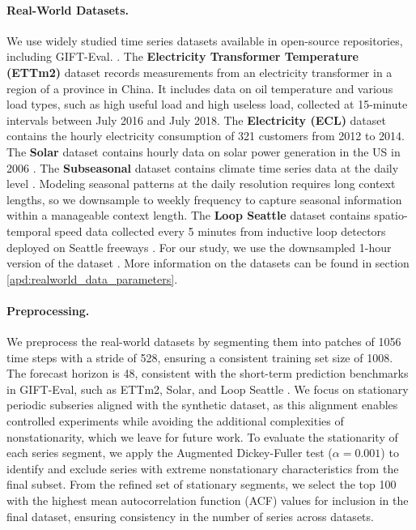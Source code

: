 \paragraph{Real-World Datasets.} We use widely studied time series datasets available in open-source repositories, including GIFT-Eval. \citep{aksu2024giftevalbenchmark}. The \textbf{Electricity Transformer Temperature (ETTm2)} dataset records measurements from an electricity transformer in a region of a province in China. It includes data on oil temperature and various load types, such as high useful load and high useless load, collected at 15-minute intervals between July 2016 and July 2018. The \textbf{Electricity (ECL)} dataset contains the hourly electricity consumption of 321 customers from 2012 to 2014. The \textbf{Solar} dataset contains hourly data on solar power generation in the US in 2006 \citep{aksu2024giftevalbenchmark, aws2024chronos}. The \textbf{Subseasonal} dataset contains climate time series data at the daily level \citep{mouatadid2024subseasonalsubseasonaldataset, aksu2024giftevalbenchmark}. Modeling seasonal patterns at the daily resolution requires long context lengths, so we downsample to weekly frequency to capture seasonal information within a manageable context length. The \textbf{Loop Seattle} dataset contains spatio-temporal speed data collected every 5 minutes from inductive loop detectors deployed on Seattle freeways \citep{cui2018deep, cui2019traffic}. For our study, we use the downsampled 1-hour version of the dataset \citep{jiang2024libcityunifiedlibraryefficient, aksu2024giftevalbenchmark}. More information on the datasets can be found in section \ref{apd:realworld_data_parameters}.

\paragraph{Preprocessing.}
We preprocess the real-world datasets by segmenting them into patches of 1056 time steps with a stride of 528, ensuring a consistent training set size of 1008. The forecast horizon is 48, consistent with the short-term prediction benchmarks in GIFT-Eval, such as ETTm2, Solar, and Loop Seattle \citep{aksu2024giftevalbenchmark}. We focus on stationary periodic subseries aligned with the synthetic dataset, as this alignment enables controlled experiments while avoiding the additional complexities of nonstationarity, which we leave for future work. To evaluate the stationarity of each series segment, we apply the Augmented Dickey-Fuller test ($\alpha=0.001$) to identify and exclude series with extreme nonstationary characteristics from the final subset. From the refined set of stationary segments, we select the top 100 with the highest mean autocorrelation function (ACF) values for inclusion in the final dataset, ensuring consistency in the number of series across datasets.

